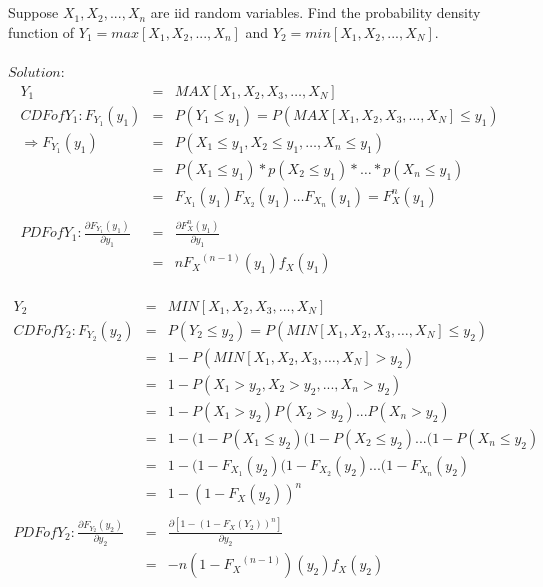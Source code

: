 \documentclass[a4paper]{article}
\begin{document}
        \subsection{}
        Suppose $X_{1},X_{2},...,X_{n}$ are iid random variables. Find the probability density function of $Y_{1}=max[X_{1},X_{2},...,X_{n}]$ and
        $Y_{2}=min[X_{1},X_{2},...,X_{N}]$.\\
        \\
        $Solution:$ \\
        \begin{eqnarray*}
            {Y_1} &=& MAX[{X_1}, {X_2}, {X_3}, …, {X_N}]\\
            CDF {} of{} {Y_1}: {F_{Y_1}}({y_1}) &=& P({Y_1} \leqslant {y_1}) = P({MAX[{X_1}, {X_2}, {X_3}, …, {X_N}] \leqslant {y_1}})\\
            \Longrightarrow {F_{Y_1}}({y_1}) &=& P({X_1} \leqslant {y_1}, {X_2} \leqslant {y_1}, … , {X_n} \leqslant {y_1}) \\
            &=& P({X_1}\leqslant{y_1}) * p({X_2}\leqslant{y_1}) * … * p({X_n}\leqslant{y_1})\\ &=& {F_{X_1}}({y_1}){F_{X_2}}({y_1})…{F_{X_n}}({y_1}) = {F_X^n}({y_1})\\
            \\
            PDF of {Y_1}: \frac{\partial {F_{Y_1}}({y_1})}{\partial {y_1}} &=& \frac{\partial {F_X^n}({y_1})}{\partial {y_1}}\\
            &=& n{{F_X}^{(n-1)}}({y_1}){f_X}({y_1})
        \end{eqnarray*}
        \\
        \begin{eqnarray*}
            {Y_2} &=& MIN[{X_1}, {X_2}, {X_3}, …, {X_N}]\\
            CDF {} of{} {Y_2}: {F_{Y_2}}({y_2}) &=& P({Y_2} \leqslant {y_2}) = P({MIN[{X_1}, {X_2}, {X_3}, …, {X_N}] \leqslant {y_2}})\\
            &=& 1 - P(MIN[{X_1}, {X_2}, {X_3}, …, {X_N}]>{y_2}) \\
            &=& 1 - P({X_1} > {y_2}, {X_2} > {y_2}, ..., {X_n} > {y_2})\\
            &=& 1 - P({X_1} > {y_2})P({X_2} > {y_2})...P({X_n} > {y_2}) \\
            &=& 1 - (1-P({X_1} \leqslant {y_2})(1-P({X_2} \leqslant {y_2})...(1-P({X_n} \leqslant {y_2})\\
            &=& 1 - (1 - {F_{X_1}}({y_2})(1 - {F_{X_2}}({y_2})...(1 - {F_{X_n}}({y_2}) \\
            &=& 1 - (1 - {F_{X}}({y_2}))^n\\
            \\
            PDF of {Y_2}: \frac{\partial {F_{Y_2}}({y_2})}{\partial {y_2}} &=& \frac{\partial [1 - (1 - {F_X}({Y_2}))^n]}{\partial {y_2}}\\
            &=& -n(1 - {{F_X}^{(n-1)}})({y_2}){f_X}({y_2})
        \end{eqnarray*}
        \vspace*{6\baselineskip}
        \bigskip
\end{document}
